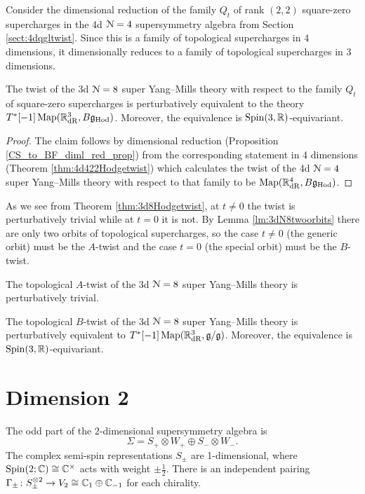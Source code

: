 \documentclass[10pt, oneside]{article}
\newcommand{\Hod}{\mathrm{Hod}}
\begin{document}
Consider the dimensional reduction of the family $Q_t$ of rank $(2, 2)$ square-zero supercharges in the 4d $\mathcal N=4$ supersymmetry algebra from Section \ref{sect:4dqgltwist}. Since this is a family of topological supercharges in 4 dimensions, it dimensionally reduces to a family of topological supercharges in 3 dimensions.

\begin{theorem}
The twist of the 3d $\mathcal N=8$ super Yang--Mills theory with respect to the family $Q_t$ of square-zero supercharges is perturbatively equivalent to the theory $T^*[-1]\map(\RR^3_{\mathrm{dR}}, B\fg_{\Hod})$. Moreover, the equivalence is $\mathrm{Spin}(3, \mathbb R)$-equivariant.
\label{thm:3d8Hodgetwist}
\end{theorem}
\begin{proof}
The claim follows by dimensional reduction (Proposition \ref{CS_to_BF_diml_red_prop}) from the corresponding statement in 4 dimensions (Theorem \ref{thm:4d422Hodgetwist}) which calculates the twist of the 4d $\mathcal N=4$ super Yang--Mills theory with respect to that family to be $\map(\RR^4_{\mathrm{dR}}, B\fg_{\Hod})$.
\end{proof}

As we see from Theorem \ref{thm:3d8Hodgetwist}, at $t\neq 0$ the twist is perturbatively trivial while at $t=0$ it is not. By Lemma \ref{lm:3dN8twoorbits} there are only two orbits of topological supercharges, so the case $t\neq 0$ (the generic orbit) must be the $A$-twist and the case $t=0$ (the special orbit) must be the $B$-twist.

\begin{cor}
The topological $A$-twist of the 3d $\mathcal N=8$ super Yang--Mills theory is perturbatively trivial.
\label{cor:3dN8Atwist}
\end{cor}

\begin{cor}
The topological $B$-twist of the 3d $\mathcal N=8$ super Yang--Mills theory is perturbatively equivalent to $T^*[-1]\operatorname{Map}(\mathbb R^3_{\mathrm{dR}}, \mathfrak g/\mathfrak g)$. Moreover, the equivalence is $\mathrm{Spin}(3, \mathbb R)$-equivariant.
\label{cor:3dN8Btwist}
\end{cor}

\section{Dimension 2}
The odd part of the $2$-dimensional supersymmetry algebra is 
\[
\Sigma = S_+ \otimes W_+ \oplus S_- \otimes W_- .
\]
The complex semi-spin representations $S_\pm$ are 1-dimensional, where $\mathrm{Spin}(2;\mathbb C) \cong \mathbb C^\times$ acts with weight $\pm \frac{1}{2}$. 
There is an independent pairing $\Gamma_\pm \colon S_\pm^{\otimes 2} \to V_2 \cong \mathbb C_1 \oplus \mathbb C_{-1}$ for each chirality.  
\end{document}
